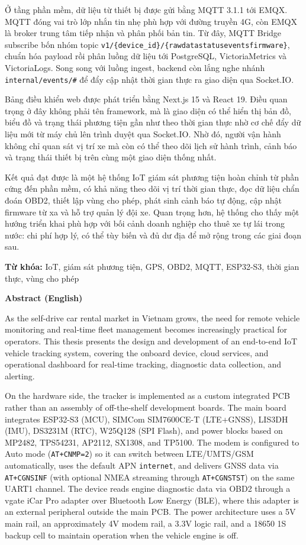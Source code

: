 \documentclass[a4paper]{extarticle}
\begin{document}
Ở tầng phần mềm, dữ liệu từ thiết bị được gửi bằng MQTT 3.1.1 tới EMQX.
MQTT đóng vai trò lớp nhắn tin nhẹ phù hợp với đường truyền 4G, còn EMQX
là broker trung tâm tiếp nhận và phân phối bản tin. Từ đây, MQTT Bridge
subscribe bốn nhóm topic
\texttt{v1/\{device\_id\}/\{rawdata\textbar status\textbar events\textbar firmware\}},
chuẩn hóa payload rồi phân luồng dữ liệu tới PostgreSQL,
VictoriaMetrics và VictoriaLogs. Song song với luồng ingest, backend còn
lắng nghe nhánh \texttt{internal/events/\#} để đẩy cập nhật thời gian
thực ra giao diện qua Socket.IO.

Bảng điều khiển web được phát triển bằng Next.js 15 và React 19. Điều
quan trọng ở đây không phải tên framework, mà là giao diện có thể hiển
thị bản đồ, biểu đồ và trạng thái phương tiện gần như theo thời gian
thực nhờ cơ chế đẩy dữ liệu mới từ máy chủ lên trình duyệt qua
Socket.IO. Nhờ đó, người vận hành không chỉ quan sát vị
trí xe mà còn có thể theo dõi lịch sử hành trình, cảnh báo và trạng thái
thiết bị trên cùng một giao diện thống nhất.

Kết quả đạt được là một hệ thống IoT giám sát phương tiện hoàn chỉnh từ
phần cứng đến phần mềm, có khả năng theo dõi vị trí thời gian thực, đọc
dữ liệu chẩn đoán OBD2, thiết lập vùng cho phép, phát sinh cảnh báo tự
động, cập nhật firmware từ xa và hỗ trợ quản lý đội xe. Quan trọng hơn,
hệ thống cho thấy một hướng triển khai phù hợp với bối cảnh doanh nghiệp
cho thuê xe tự lái trong nước: chi phí hợp lý, có thể tùy biến và đủ dư
địa để mở rộng trong các giai đoạn sau.

\textbf{Từ khóa:} IoT, giám sát phương tiện, GPS, OBD2, MQTT, ESP32-S3,
thời gian thực, vùng cho phép

\textbf{Abstract (English)}

As the self-drive car rental market in Vietnam grows, the need for
remote vehicle monitoring and real-time fleet management becomes
increasingly practical for operators. This thesis presents the design
and development of an end-to-end IoT vehicle tracking system, covering
the onboard device, cloud services, and operational dashboard for
real-time tracking, diagnostic data collection, and alerting.

On the hardware side, the tracker is implemented as a custom integrated
PCB rather than an assembly of off-the-shelf development boards. The
main board integrates ESP32-S3 (MCU), SIMCom SIM7600CE-T (LTE+GNSS),
LIS3DH (IMU), DS3231M (RTC), W25Q128 (SPI Flash), and power blocks based
on MP2482, TPS54231, AP2112, SX1308, and TP5100. The modem is configured
to Auto mode (\texttt{AT+CNMP=2}) so it can switch between LTE/UMTS/GSM
automatically, uses the default APN \texttt{internet}, and delivers GNSS
data via \texttt{AT+CGNSINF} (with optional NMEA streaming through
\texttt{AT+CGNSTST}) on the same UART1 channel. The device reads engine
diagnostic data via OBD2 through a vgate iCar Pro adapter over Bluetooth
Low Energy (BLE), where this adapter is an external peripheral outside
the main PCB. The power architecture uses a 5V main rail, an
approximately 4V modem rail, a 3.3V logic rail, and a 18650 1S backup
cell to maintain operation when the vehicle engine is off.
\end{document}
